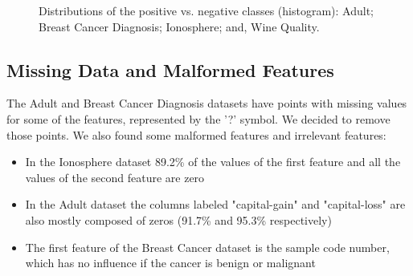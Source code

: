 \documentclass[conference]{IEEEtran}
\begin{document}
\begin{figure}
%
\caption[Distributions of the positive vs.
negative classes (histogram).]{Distributions of the positive vs.
negative classes (histogram):
 Adult;
 Breast Cancer Diagnosis;
 Ionosphere; and,
 Wine Quality.}%
\label{fig:output_labels}%
\end{figure}

\subsection{Missing Data and Malformed Features}

The Adult and Breast Cancer Diagnosis datasets have points with missing values for some of the features, represented by the '?' symbol. We decided to remove those points. We also found some malformed features and irrelevant features:

\begin{itemize}
    \item In the Ionosphere dataset 89.2\% of the values of the first feature and all the values of the second feature are zero
    \item In the Adult dataset the columns labeled "capital-gain" and "capital-loss" are also mostly composed of zeros (91.7\% and 95.3\% respectively)
    \item The first feature of the Breast Cancer dataset is the sample code number, which has no influence if the cancer is benign or malignant
\end{itemize}
\end{document}
